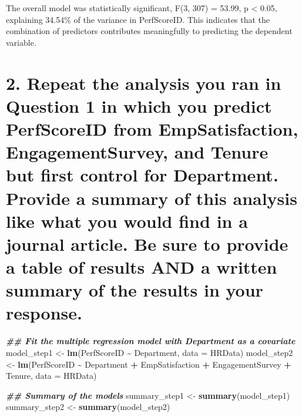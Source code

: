 \documentclass[
]{article}
\newenvironment{Shaded}{\begin{snugshade}}{\end{snugshade}}
\newcommand{\AttributeTok}[1]{\textcolor[rgb]{0.13,0.29,0.53}{#1}}
\newcommand{\DocumentationTok}[1]{\textcolor[rgb]{0.56,0.35,0.01}{\textbf{\textit{#1}}}}
\newcommand{\FunctionTok}[1]{\textcolor[rgb]{0.13,0.29,0.53}{\textbf{#1}}}
\newcommand{\NormalTok}[1]{#1}
\newcommand{\OtherTok}[1]{\textcolor[rgb]{0.56,0.35,0.01}{#1}}
\newcommand{\SpecialCharTok}[1]{\textcolor[rgb]{0.81,0.36,0.00}{\textbf{#1}}}
\begin{document}
The overall model was statistically significant, F(3, 307) = 53.99, p
\textless{} 0.05, explaining 34.54\% of the variance in PerfScoreID.
This indicates that the combination of predictors contributes
meaningfully to predicting the dependent variable.

\section{2. Repeat the analysis you ran in Question 1 in which you
predict PerfScoreID from EmpSatisfaction, EngagementSurvey, and Tenure
but first control for Department. Provide a summary of this analysis
like what you would find in a journal article. Be sure to provide a
table of results AND a written summary of the results in your
response.}\label{repeat-the-analysis-you-ran-in-question-1-in-which-you-predict-perfscoreid-from-empsatisfaction-engagementsurvey-and-tenure-but-first-control-for-department.-provide-a-summary-of-this-analysis-like-what-you-would-find-in-a-journal-article.-be-sure-to-provide-a-table-of-results-and-a-written-summary-of-the-results-in-your-response.}

\begin{Shaded}
\begin{Highlighting}[]
\DocumentationTok{\#\# Fit the multiple regression model with Department as a covariate}
\NormalTok{model\_step1 }\OtherTok{\textless{}{-}} \FunctionTok{lm}\NormalTok{(PerfScoreID }\SpecialCharTok{\textasciitilde{}}\NormalTok{ Department, }\AttributeTok{data =}\NormalTok{ HRData)}
\NormalTok{model\_step2 }\OtherTok{\textless{}{-}} \FunctionTok{lm}\NormalTok{(PerfScoreID }\SpecialCharTok{\textasciitilde{}}\NormalTok{ Department }\SpecialCharTok{+}\NormalTok{ EmpSatisfaction }\SpecialCharTok{+}\NormalTok{ EngagementSurvey }\SpecialCharTok{+}\NormalTok{ Tenure, }\AttributeTok{data =}\NormalTok{ HRData)}

\DocumentationTok{\#\# Summary of the models}
\NormalTok{summary\_step1 }\OtherTok{\textless{}{-}} \FunctionTok{summary}\NormalTok{(model\_step1)}
\NormalTok{summary\_step2 }\OtherTok{\textless{}{-}} \FunctionTok{summary}\NormalTok{(model\_step2)}
\end{Highlighting}
\end{Shaded}
\end{document}
